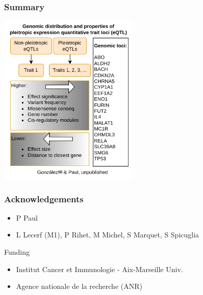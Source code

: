 \documentclass{beamer}
\begin{document}
    \begin{frame}
        \frametitle{Summary}

        \begin{center}
            \includegraphics[width=0.5\textwidth]{fig/graphical_abstract.drawio.png}
        \end{center}

    \end{frame}

    \begin{frame}
        \frametitle{Acknowledgements}

        \begin{itemize}
            \item P Paul
            \item L Lecerf (M1), P Rihet, M Michel, S Marquet, S Spicuglia
        \end{itemize}
%
        \vfill
%
        Funding
%
        \begin{itemize}
            \item Institut Cancer et Immunologie - Aix-Marseille Univ.
            \item Agence nationale de la recherche (ANR)
        \end{itemize}

    \end{frame}
\end{document}
